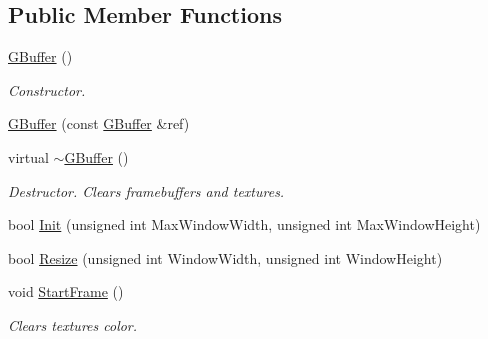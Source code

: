 \subsection*{Public Member Functions}
\begin{DoxyCompactItemize}
\item 
\mbox{\label{class_geometry_engine_1_1_geometry_buffer_1_1_g_buffer_a183f95dfe1f25ca8be80c7cb81d3f068}} 
\mbox{\hyperlink{class_geometry_engine_1_1_geometry_buffer_1_1_g_buffer_a183f95dfe1f25ca8be80c7cb81d3f068}{G\+Buffer}} ()
\begin{DoxyCompactList}\small\item\em Constructor. \end{DoxyCompactList}\item 
\mbox{\hyperlink{class_geometry_engine_1_1_geometry_buffer_1_1_g_buffer_a9b44aaba6f5e1ef02cdc8ab821d560bb}{G\+Buffer}} (const \mbox{\hyperlink{class_geometry_engine_1_1_geometry_buffer_1_1_g_buffer}{G\+Buffer}} \&ref)
\item 
\mbox{\label{class_geometry_engine_1_1_geometry_buffer_1_1_g_buffer_ae08b52fa3acd40b81a7de73ec8dcd03a}} 
virtual \mbox{\hyperlink{class_geometry_engine_1_1_geometry_buffer_1_1_g_buffer_ae08b52fa3acd40b81a7de73ec8dcd03a}{$\sim$\+G\+Buffer}} ()
\begin{DoxyCompactList}\small\item\em Destructor. Clears framebuffers and textures. \end{DoxyCompactList}\item 
bool \mbox{\hyperlink{class_geometry_engine_1_1_geometry_buffer_1_1_g_buffer_ad4d5684575aa5819a91097a1b6a0e8df}{Init}} (unsigned int Max\+Window\+Width, unsigned int Max\+Window\+Height)
\item 
bool \mbox{\hyperlink{class_geometry_engine_1_1_geometry_buffer_1_1_g_buffer_a487fb4fb346b34e5fa4a994e97211bab}{Resize}} (unsigned int Window\+Width, unsigned int Window\+Height)
\item 
\mbox{\label{class_geometry_engine_1_1_geometry_buffer_1_1_g_buffer_adda275d5380f81e48c41114b52eaaa5f}} 
void \mbox{\hyperlink{class_geometry_engine_1_1_geometry_buffer_1_1_g_buffer_adda275d5380f81e48c41114b52eaaa5f}{Start\+Frame}} ()
\begin{DoxyCompactList}\small\item\em Clears textures color. \end{DoxyCompactList}\item 

\end{DoxyCompactItemize}
